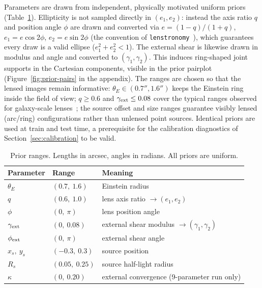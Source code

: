 \documentclass[11pt,a4paper]{article}
\begin{document}
Parameters are drawn from independent, physically motivated uniform priors
(Table~\ref{tab:priors}). Ellipticity is not sampled directly in $(e_1, e_2)$:
instead the axis ratio $q$ and position angle $\phi$ are drawn and converted via
$e = (1-q)/(1+q)$, $e_1 = e\cos 2\phi$, $e_2 = e\sin 2\phi$ (the convention of
\texttt{lenstronomy}~\cite{birrer2018lenstronomy}), which guarantees every draw is a
valid ellipse ($e_1^2 + e_2^2 < 1$). The external shear is likewise drawn in modulus
and angle and converted to $(\gamma_1, \gamma_2)$. This induces ring-shaped joint
supports in the Cartesian components, visible in the prior pairplot
(Figure~\ref{fig:prior-pairs} in the appendix). The ranges are chosen so that the
lensed images remain informative: $\theta_E \in (0.7'', 1.6'')$ keeps the Einstein
ring inside the field of view; $q \geq 0.6$ and $\gamma_{\rm ext} \leq 0.08$ cover
the typical ranges observed for galaxy-scale lenses~\cite{kormann1994sie,
schneider2013msd}; the source offset and size ranges guarantee visibly lensed
(arc/ring) configurations rather than unlensed point sources. Identical priors are
used at train and test time, a prerequisite for the calibration diagnostics of
Section~\ref{sec:calibration} to be valid.

\begin{table}[H]
\centering
\caption{Prior ranges. Lengths in arcsec, angles in radians. All priors are uniform.}
\label{tab:priors}
\begin{tabular}{lll}
\toprule
Parameter & Range & Meaning \\
\midrule
$\theta_E$          & $(0.7,\ 1.6)$    & Einstein radius \\
$q$                 & $(0.6,\ 1.0)$    & lens axis ratio $\rightarrow (e_1, e_2)$ \\
$\phi$              & $(0,\ \pi)$      & lens position angle \\
$\gamma_{\rm ext}$  & $(0,\ 0.08)$     & external shear modulus $\rightarrow (\gamma_1, \gamma_2)$ \\
$\phi_{\rm ext}$    & $(0,\ \pi)$      & external shear angle \\
$x_s,\ y_s$         & $(-0.3,\ 0.3)$   & source position \\
$R_s$               & $(0.05,\ 0.25)$  & source half-light radius \\
$\kappa$            & $(0,\ 0.20)$     & external convergence (9-parameter run only) \\
\bottomrule
\end{tabular}
\end{table}
\end{document}
